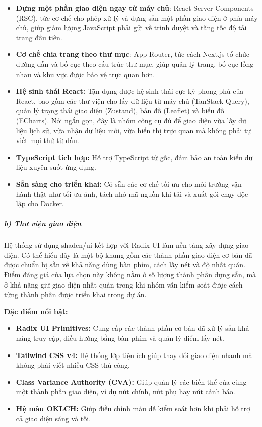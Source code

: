\documentclass[a4paper]{extarticle}
\providecommand{\tightlist}{%
  \setlength{\itemsep}{0pt}\setlength{\parskip}{0pt}}
\begin{document}
\begin{itemize}
\tightlist
\item
  \textbf{Dựng một phần giao diện ngay từ máy chủ}: React Server Components
  (RSC), tức cơ chế cho phép xử lý và dựng sẵn một phần giao diện ở phía
  máy chủ, giúp giảm lượng JavaScript phải gửi về trình duyệt và tăng
  tốc độ tải trang đầu tiên.
\item
  \textbf{Cơ chế chia trang theo thư mục}: App Router, tức cách Next.js
  tổ chức đường dẫn và bố cục theo cấu trúc thư mục, giúp quản lý trang,
  bố cục lồng nhau và khu vực được bảo vệ trực quan hơn.
\item
  \textbf{Hệ sinh thái React:} Tận dụng được hệ sinh thái cực kỳ phong
  phú của React, bao gồm các thư viện cho lấy dữ liệu từ máy chủ
  (TanStack Query), quản lý trạng thái giao diện (Zustand), bản đồ
  (Leaflet) và biểu đồ (ECharts). Nói ngắn gọn, đây là nhóm công cụ đủ
  để giao diện vừa lấy dữ liệu lịch sử, vừa nhận dữ liệu mới, vừa hiển
  thị trực quan mà không phải tự viết mọi thứ từ đầu.
\item
  \textbf{TypeScript tích hợp:} Hỗ trợ TypeScript từ gốc, đảm bảo an
  toàn kiểu dữ liệu xuyên suốt ứng dụng.
\item
  \textbf{Sẵn sàng cho triển khai:} Có sẵn các cơ chế tối ưu cho môi
  trường vận hành thật như tối ưu ảnh, tách nhỏ mã nguồn khi tải và xuất gói
  chạy độc lập cho Docker.
\end{itemize}

\subparagraph{b) Thư viện giao diện}\label{b-thux1b0-viux1ec7n-giao-diux1ec7n-ui-component-library}

Hệ thống sử dụng shadcn/ui kết hợp với Radix UI làm nền tảng xây dựng
giao diện. Có thể hiểu đây là một bộ khung gồm các thành phần giao diện
cơ bản đã được chuẩn bị sẵn về khả năng dùng bàn phím, cách lấy nét và
độ nhất quán. Điểm đáng giá của lựa chọn này không nằm ở số lượng thành phần
dựng sẵn, mà ở khả năng giữ giao diện nhất quán trong khi nhóm vẫn kiểm
soát được cách từng thành phần được triển khai trong dự án.

\textbf{Đặc điểm nổi bật:}

\begin{itemize}
\tightlist
\item
  \textbf{Radix UI Primitives:} Cung cấp các thành phần cơ bản đã xử lý
  sẵn khả năng truy cập, điều hướng bằng bàn phím và quản lý điểm lấy nét.
\item
  \textbf{Tailwind CSS v4:} Hệ thống lớp tiện ích giúp thay đổi giao diện
  nhanh mà không phải viết nhiều CSS thủ công.
\item
  \textbf{Class Variance Authority (CVA):} Giúp quản lý các biến thể của
  cùng một thành phần giao diện, ví dụ nút chính, nút phụ hay nút cảnh báo.
\item
  \textbf{Hệ màu OKLCH:} Giúp điều chỉnh màu dễ kiểm soát hơn khi phải
  hỗ trợ cả giao diện sáng và tối.
\end{itemize}
\end{document}
